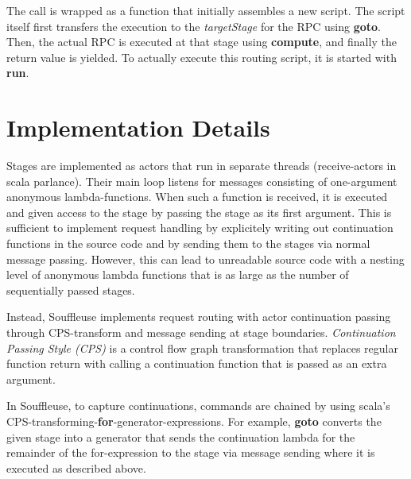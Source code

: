 \documentclass{sig-alternate}
\begin{document}
The call is wrapped as a function that initially assembles a new script. The script itself first
transfers the execution to the \emph{targetStage} for the RPC using \textbf{goto}. Then, the actual
RPC is executed at that stage using \textbf{compute}, and finally the return value is yielded. To
actually execute this routing script, it is started with \textbf{run}.




	

\section{Implementation Details}

Stages are implemented as actors that run in separate threads (receive-actors in scala parlance).
Their main loop listens for messages consisting of one-argument anonymous lambda-functions. When
such a function is received, it is executed and given access to the stage by passing the stage as
its first argument. This is sufficient to implement request handling by explicitely writing out
continuation functions in the source code and by sending them to the stages via normal message
passing. However, this can lead to unreadable source code with a nesting level of anonymous lambda
functions that is as large as the number of sequentially passed stages.

Instead, Souffleuse implements request routing with actor continuation passing through CPS-transform
and message sending at stage boundaries. \emph{Continuation Passing Style (CPS)} is a control flow
graph transformation that replaces regular function return with calling a continuation function that
is passed as an extra argument.

In Souffleuse, to capture continuations, commands are chained by using scala's
CPS-transforming-\textbf{for}-generator-expressions. For example, \textbf{goto} converts the given
stage into a generator that sends the continuation lambda for the remainder of the for-expression to
the stage via message sending where it is executed as described above.
\end{document}
